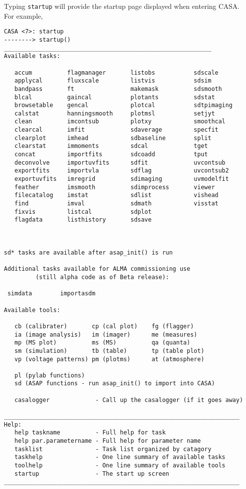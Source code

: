Typing {\tt startup} will provide the startup page displayed when
entering CASA.  For example,
\small
\begin{verbatim}
CASA <7>: startup
--------> startup()
___________________________________________________________
Available tasks:

   accum          flagmanager       listobs           sdscale
   applycal       fluxscale         listvis           sdsim
   bandpass       ft                makemask          sdsmooth
   blcal          gaincal           plotants          sdstat
   browsetable    gencal            plotcal           sdtpimaging
   calstat        hanningsmooth     plotmsl           setjyt
   clean          imcontsub         plotxy            smoothcal
   clearcal       imfit             sdaverage         specfit
   clearplot      imhead            sdbaseline        split
   clearstat      immoments         sdcal             tget
   concat         importfits        sdcoadd           tput
   deconvolve     importuvfits      sdfit             uvcontsub
   exportfits     importvla         sdflag            uvcontsub2
   exportuvfits   imregrid          sdimaging         uvmodelfit
   feather        imsmooth          sdimprocess       viewer
   filecatalog    imstat            sdlist            vishead
   find           imval             sdmath            visstat
   fixvis         listcal           sdplot
   flagdata       listhistory       sdsave


                
sd* tasks are available after asap_init() is run

Additional tasks available for ALMA commissioning use
         (still alpha code as of Beta release):

 simdata        importasdm

Available tools:

   cb (calibrater)       cp (cal plot)    fg (flagger)
   ia (image analysis)   im (imager)      me (measures)
   mp (MS plot)          ms (MS)          qa (quanta)
   sm (simulation)       tb (table)       tp (table plot)
   vp (voltage patterns) pm (plotms)      at (atmosphere)

   pl (pylab functions)
   sd (ASAP functions - run asap_init() to import into CASA)

   casalogger             - Call up the casalogger (if it goes away)
   
___________________________________________________________________
Help:
   help taskname          - Full help for task
   help par.parametername - Full help for parameter name
   tasklist               - Task list organized by catagory
   taskhelp               - One line summary of available tasks
   toolhelp               - One line summary of available tools
   startup                - The start up screen
___________________________________________________________________


\end{verbatim}
\normalsize

